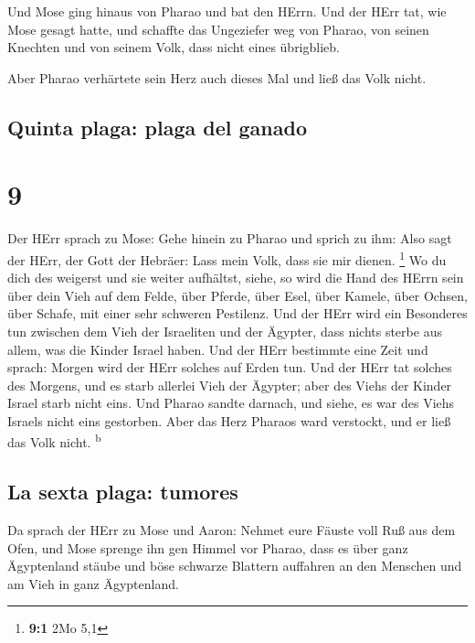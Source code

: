  Und Mose ging hinaus von Pharao und bat den HErrn.
 Und der HErr tat, wie Mose gesagt hatte, und schaffte
das Ungeziefer weg von Pharao, von seinen Knechten und von seinem Volk,
dass nicht eines übrigblieb.

 Aber Pharao verhärtete sein Herz auch dieses Mal und
ließ das Volk nicht.

\hypertarget{quinta-plaga-plaga-del-ganado}{%
\subsection{Quinta plaga: plaga del
ganado}\label{quinta-plaga-plaga-del-ganado}}

\hypertarget{section-8}{%
\section{9}\label{section-8}}

 Der HErr sprach zu Mose: Gehe hinein zu Pharao und sprich
zu ihm: Also sagt der HErr, der Gott der Hebräer: Lass mein Volk, dass
sie mir dienen. \footnote{\textbf{9:1} 2Mo 5,1}  Wo du
dich des weigerst und sie weiter aufhältst,  siehe, so
wird die Hand des HErrn sein über dein Vieh auf dem Felde, über Pferde,
über Esel, über Kamele, über Ochsen, über Schafe, mit einer sehr
schweren Pestilenz.  Und der HErr wird ein Besonderes tun
zwischen dem Vieh der Israeliten und der Ägypter, dass nichts sterbe aus
allem, was die Kinder Israel haben.  Und der HErr
bestimmte eine Zeit und sprach: Morgen wird der HErr solches auf Erden
tun.  Und der HErr tat solches des Morgens, und es starb
allerlei Vieh der Ägypter; aber des Viehs der Kinder Israel starb nicht
eins.  Und Pharao sandte darnach, und siehe, es war des
Viehs Israels nicht eins gestorben. Aber das Herz Pharaos ward
verstockt, und er ließ das Volk nicht. \textsuperscript{b}

\hypertarget{la-sexta-plaga-tumores}{%
\subsection{La sexta plaga: tumores}\label{la-sexta-plaga-tumores}}

 Da sprach der HErr zu Mose und Aaron: Nehmet eure Fäuste
voll Ruß aus dem Ofen, und Mose sprenge ihn gen Himmel vor Pharao,
 dass es über ganz Ägyptenland stäube und böse schwarze
Blattern auffahren an den Menschen und am Vieh in ganz Ägyptenland.

